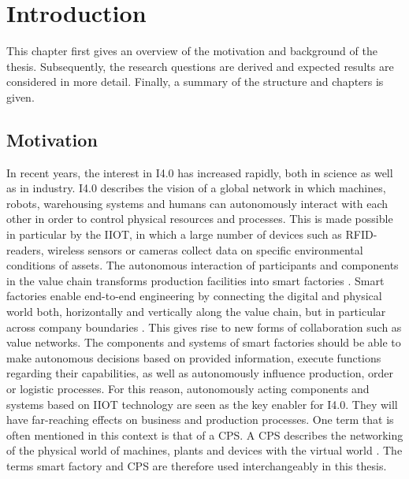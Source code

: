 \chapter{Introduction} \label{chap:introduction}
This chapter first gives an overview of the motivation and background of the thesis. Subsequently, the research questions are derived and expected results are considered in more detail. Finally, a summary of the structure and chapters is given.

\section{Motivation}
In recent years, the interest in \ac{I4.0} has increased rapidly, both in science as well as in industry. \ac{I4.0} describes the vision of a global network in which machines, robots, warehousing systems and humans can autonomously interact with each other in order to control physical resources and processes. This is made possible in particular by the \ac{IIOT}, in which a large number of devices such as RFID-readers, wireless sensors or cameras collect data on specific environmental conditions of assets. The autonomous interaction of participants and components in the value chain transforms production facilities into smart factories \cite[p. 20]{Acatech2013Recommendations4.0}. Smart factories enable end-to-end engineering by connecting the digital and physical world both, horizontally and vertically along the value chain, but in particular across company boundaries \cite[p. 859]{Uslander2015ReferenceApproach}. This gives rise to new forms of collaboration such as value networks. The components and systems of smart factories should be able to make autonomous decisions based on provided information, execute functions regarding their capabilities, as well as autonomously influence production, order or logistic processes. For this reason, autonomously acting components and systems based on \ac{IIOT} technology are seen as the key enabler for \ac{I4.0}. They will have far-reaching effects on business and production processes. One term that is often mentioned in this context is that of a \ac{CPS}. A \ac{CPS} describes the networking of the physical world of machines, plants and devices with the virtual world \cite{Lee2008CyberBerkeley}. The terms smart factory and \ac{CPS} are therefore used interchangeably in this thesis.

